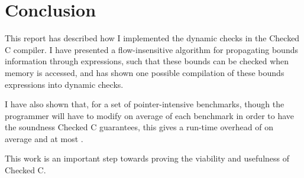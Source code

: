 \chapter{Conclusion}
\label{sec:conclusion}

This report has described how I implemented the dynamic checks in the
Checked C compiler. I have presented a flow-insensitive algorithm for
propagating bounds information through expressions, such that these
bounds can be checked when memory is accessed, and has shown one
possible compilation of these bounds expressions into dynamic checks.

I have also shown that, for a set of pointer-intensive benchmarks,
though the programmer will have to modify on average
\ResultLinesModifiedMean of each benchmark in order to have the
soundness Checked C guarantees, this gives a run-time overhead of on
average \ResultRunTimeMean and at most \ResultRunTimeMax.

This work is an important step towards proving the viability and
usefulness of Checked C.



